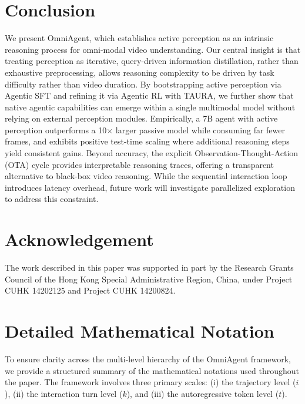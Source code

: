 \documentclass{article}
\theoremstyle{plain}
\theoremstyle{definition}
\theoremstyle{remark}
\newcommand{\model}{OmniAgent\xspace}
\begin{document}
\section{Conclusion}
\label{sec:conclusion}

We present \model, which establishes active perception as an
intrinsic reasoning process for omni-modal video understanding. Our
central insight is that treating perception as iterative,
query-driven information distillation, rather than exhaustive
preprocessing, allows reasoning complexity to be driven by task
difficulty rather than video duration. By bootstrapping active
perception via Agentic SFT and refining it via Agentic RL with
TAURA, we further show that native agentic capabilities can emerge
within a single multimodal model without relying on external
perception modules. Empirically, a 7B agent with active
perception outperforms a 10$\times$ larger passive model while
consuming far fewer frames, and exhibits positive test-time scaling
where additional reasoning steps yield consistent gains. Beyond
accuracy, the explicit Observation-Thought-Action (OTA) cycle
provides interpretable reasoning traces, offering a transparent
alternative to black-box video reasoning. While the sequential
interaction loop introduces latency overhead, future work will
investigate parallelized exploration to address this constraint.



\section*{Acknowledgement}
The work described in this paper was supported in part by the Research Grants Council of the Hong Kong Special Administrative Region, China, under Project CUHK 14202125 and Project CUHK 14200824.








\newpage
\appendix
\onecolumn



\section{Detailed Mathematical Notation}
\label{app:notation}

To ensure clarity across the multi-level hierarchy of the OmniAgent framework, we provide a structured summary of the mathematical notations used throughout the paper. The framework involves three primary scales: (i) the trajectory level ($i$), (ii) the interaction turn level ($k$), and (iii) the autoregressive token level ($t$).
\end{document}
